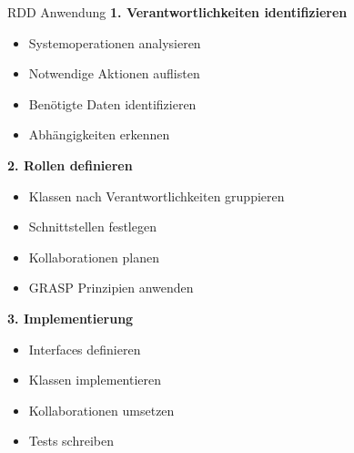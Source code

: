 \begin{KR}{RDD Anwendung}
\textbf{1. Verantwortlichkeiten identifizieren}
\begin{itemize}
    \item Systemoperationen analysieren
    \item Notwendige Aktionen auflisten
    \item Benötigte Daten identifizieren
    \item Abhängigkeiten erkennen
\end{itemize}

\textbf{2. Rollen definieren}
\begin{itemize}
    \item Klassen nach Verantwortlichkeiten gruppieren
    \item Schnittstellen festlegen
    \item Kollaborationen planen
    \item GRASP Prinzipien anwenden
\end{itemize}

\textbf{3. Implementierung}
\begin{itemize}
    \item Interfaces definieren
    \item Klassen implementieren
    \item Kollaborationen umsetzen
    \item Tests schreiben
\end{itemize}
\end{KR}

